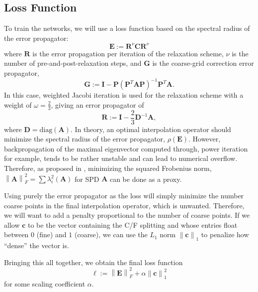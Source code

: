 \documentclass{article}
\newcommand{\norm}[1]{\left\lVert#1\right\rVert}
\newcommand{\mat}[1]{\bm{{#1}}}
\renewcommand{\vec}[1]{\bm{{#1}}}
\begin{document}
\subsection{Loss Function}
To train the networks, we will use a loss function based on the spectral radius of the error propagator:
\begin{equation}
  \mat{E} := \mat{R}^\nu \mat{C} \mat{R}^\nu
\end{equation}
where $\mat{R}$ is the error propagation per iteration of the relaxation scheme, $\nu$ is the number of pre-and-post-relaxation steps, and $\mat{G}$ is the coarse-grid correction error propagator,
\begin{equation}
  \mat{G} := \mat{I} - \mat{P} \left( \mat{P}^T \mat{A} \mat{P} \right)^{-1} \mat{P}^T \mat{A}.
\end{equation}
In this case, weighted Jacobi iteration is used for the relaxation scheme with a weight of $\omega=\frac{2}{3}$, giving an error propagator of
\begin{equation}
  \mat{R} := \mat{I} - \frac{2}{3}\mat{D}^{-1}\mat{A},
\end{equation}
where $\mat{D}=\text{diag}\left(\mat{A}\right)$.  In theory, an optimal interpolation operator should minimize the spectral radius of the error propagator, $\rho\left(\mat{E}\right)$.  However, backpropagation of the maximal eigenvector computed through, power iteration for example, tends to be rather unstable and can lead to numerical overflow\cite{wang2019backpropagationfriendly}.  Therefore, as proposed in \cite{luz2020learning}, minimizing the squared Frobenius norm, $\norm{\mat{A}}_F^2=\sum\lambda^2_i\left(\mat{A}\right)$ for SPD $\mat{A}$ can be done as a proxy.

Using purely the error propagator as the loss will simply minimize the number coarse points in the final interpolation operator, which is unwanted.  Therefore, we will want to add a penalty proportional to the number of coarse points.  If we allow $\vec{c}$ to be the vector containing the C/F splitting and whose entries float between $0$ (fine) and $1$ (coarse), we can use the $L_1$ norm $\norm{\vec{c}}_1$ to penalize how ``dense'' the vector is.

Bringing this all together, we obtain the final loss function
\begin{equation}
  \ell := \norm{\mat{E}}^2_F + \alpha \norm{\vec{c}}_1^2 \label{eqn:loss}
\end{equation}
for some scaling coefficient $\alpha$.
\end{document}
